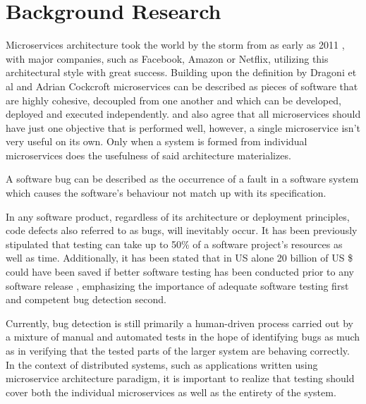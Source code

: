 \chapter{Background Research}\label{chp:background-research}
Microservices architecture took the world by the storm from as early as 2011 \cite{fowlerOnMicroservices}, with major companies, such as Facebook, Amazon or Netflix, utilizing this architectural style with great success.
Building upon the definition by Dragoni et al \cite{dragoniOnMs} and Adrian Cockcroft \cite{understandingOfMicroservices} microservices can be described as pieces of software that are highly cohesive, decoupled from one another and which can be developed, deployed and executed independently. \cite{dragoniOnMs} and \cite{understandingOfMicroservices} also agree that all microservices should have just one objective that is performed well, however, a single microservice isn't very useful on its own. Only when a system is formed from individual microservices does the usefulness of said architecture materializes.

A software bug can be described as the occurrence of a fault in a software system which causes the software's behaviour not match up with its specification\cite{predicting-severity-of-a-bug}.
  
In any software product, regardless of its architecture or deployment principles, code defects also referred to as bugs, will inevitably occur. It has been previously stipulated that testing can take up to 50\% of a software project's resources as well as time. Additionally, it has been stated that in US alone 20 billion of US \$ could have been saved if better software testing has been conducted prior to any software release \cite{auto-bug-fixing}, emphasizing the importance of adequate software testing first and competent bug detection second.

Currently, bug detection is still primarily a human-driven process carried out by a mixture of manual and automated tests in the hope of identifying bugs as much as in verifying that the tested parts of the larger system are behaving correctly. 
In the context of distributed systems, such as applications written using microservice architecture paradigm, it is important to realize that testing should cover both the individual microservices as well as the entirety of the system.


